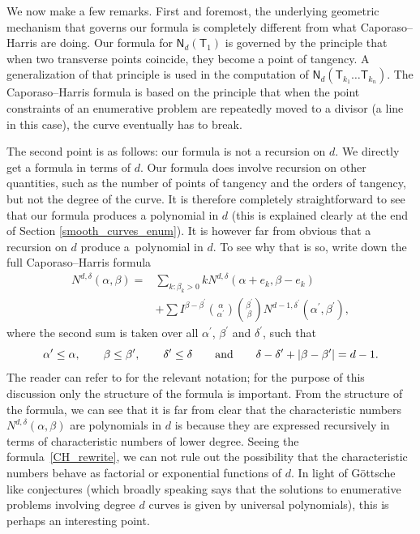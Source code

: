 \documentclass[pdftex]{sigma}
\numberwithin{equation}{section}
\begin{document}
We now make a few remarks. First and foremost, the underlying geometric mechanism
that governs our formula is completely different from what Caporaso--Harris are doing.
Our formula for $\mathsf{N}_d(\mathsf{T}_1)$
is governed by the principle that when two transverse points coincide, they
become a point of tangency.
A generalization of that principle is used in the computation of
$\mathsf{N}_d(\mathsf{T}_{k_1} \dots \mathsf{T}_{k_n})$.
The Caporaso--Harris formula is based on the principle that when
the point constraints of an enumerative problem are repeatedly
moved to a divisor (a line in this case), the
curve eventually has to break.

The second point is as follows: our formula is not a recursion on $d$.
We directly get a formula in terms of $d$. Our formula does involve recursion on other
quantities, such as the number of points of tangency and the orders of tangency,
but not the degree of the curve.
It is therefore completely straightforward to see that
our formula produces a polynomial in $d$ (this is
explained clearly at the end of Section \ref{smooth_curves_enum}).
It is however far from obvious that a recursion on $d$ produce a~polynomial in $d$.
To see why that is so, write down the
full Caporaso--Harris formula \cite[p.~348, Theorem 1.1]{CH}
\begin{align}
N^{d, \delta}(\alpha, \beta)={}& \sum_{k:\beta_k>0} k N^{d, \delta}(\alpha+e_k, \beta-e_k) \nonumber \\
              & + \sum I^{\beta-\beta^{\prime}} \binom{\alpha}{\alpha^{\prime}}
                \binom{\beta^{\prime}}{\beta} N^{d-1, \delta^{\prime}}
                (\alpha^{\prime}, \beta^{\prime}),
                \label{CH_rewrite}
\end{align}
where the second sum is taken over all $\alpha^{\prime}$, $\beta^{\prime}$
and $\delta^{\prime}$, such that
\[\alpha^{\prime} \leq \alpha, \qquad
\beta \leq \beta^{\prime}, \qquad
\delta^{\prime} \leq \delta \qquad \textnormal{and}
\qquad \delta-\delta^{\prime}+ |\beta-\beta^{\prime}| = d-1.\]
The reader can refer to \cite{CH} for the
relevant notation; for the purpose of this discussion only the structure of the
formula is important.
From the structure of the formula, we can see that it is far from clear that
the characteristic numbers
$N^{d, \delta}(\alpha, \beta)$ are polynomials in $d$ is because
they are expressed recursively in terms of characteristic numbers of lower degree.
Seeing the formula~\eqref{CH_rewrite}, we can not rule out the possibility that
the characteristic numbers
behave as factorial or exponential functions of $d$.
In light of
G{\"o}ttsche like conjectures (which broadly speaking says that the solutions to enumerative problems
involving degree $d$ curves is given by universal polynomials), this is perhaps an
interesting point.
\end{document}
